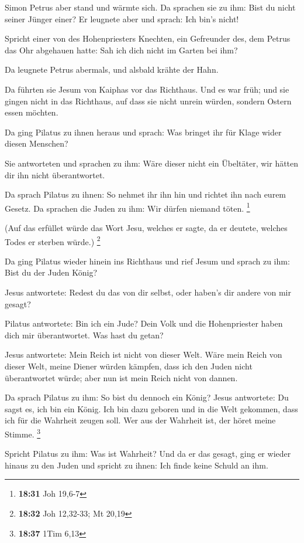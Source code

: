  Simon Petrus aber stand und wärmte sich. Da sprachen sie
zu ihm: Bist du nicht seiner Jünger einer? Er leugnete aber und sprach:
Ich bin's nicht!

 Spricht einer von des Hohenpriesters Knechten, ein
Gefreunder des, dem Petrus das Ohr abgehauen hatte: Sah ich dich nicht
im Garten bei ihm?

 Da leugnete Petrus abermals, und alsbald krähte der
Hahn.

 Da führten sie Jesum von Kaiphas vor das Richthaus. Und
es war früh; und sie gingen nicht in das Richthaus, auf dass sie nicht
unrein würden, sondern Ostern essen möchten.

 Da ging Pilatus zu ihnen heraus und sprach: Was bringet
ihr für Klage wider diesen Menschen?

 Sie antworteten und sprachen zu ihm: Wäre dieser nicht
ein Übeltäter, wir hätten dir ihn nicht überantwortet.

 Da sprach Pilatus zu ihnen: So nehmet ihr ihn hin und
richtet ihn nach eurem Gesetz. Da sprachen die Juden zu ihm: Wir dürfen
niemand töten. \footnote{\textbf{18:31} Joh 19,6-7}

 (Auf das erfüllet würde das Wort Jesu, welches er sagte,
da er deutete, welches Todes er sterben würde.) \footnote{\textbf{18:32}
  Joh 12,32-33; Mt 20,19}

 Da ging Pilatus wieder hinein ins Richthaus und rief
Jesum und sprach zu ihm: Bist du der Juden König?

 Jesus antwortete: Redest du das von dir selbst, oder
haben's dir andere von mir gesagt?

 Pilatus antwortete: Bin ich ein Jude? Dein Volk und die
Hohenpriester haben dich mir überantwortet. Was hast du getan?

 Jesus antwortete: Mein Reich ist nicht von dieser Welt.
Wäre mein Reich von dieser Welt, meine Diener würden kämpfen, dass ich
den Juden nicht überantwortet würde; aber nun ist mein Reich nicht von
dannen.

 Da sprach Pilatus zu ihm: So bist du dennoch ein König?
Jesus antwortete: Du sagst es, ich bin ein König. Ich bin dazu geboren
und in die Welt gekommen, dass ich für die Wahrheit zeugen soll. Wer aus
der Wahrheit ist, der höret meine Stimme. \footnote{\textbf{18:37} 1Tim
  6,13}

 Spricht Pilatus zu ihm: Was ist Wahrheit? Und da er das
gesagt, ging er wieder hinaus zu den Juden und spricht zu ihnen: Ich
finde keine Schuld an ihm.

